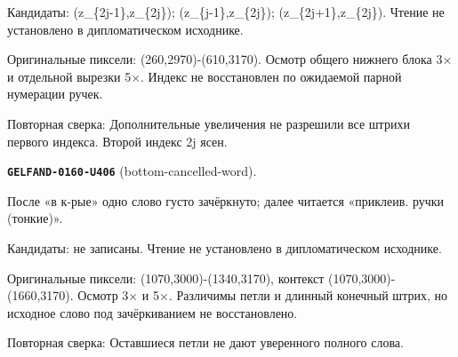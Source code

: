 Кандидаты: (z\_\{2j-1\},z\_\{2j\}); (z\_\{j-1\},z\_\{2j\}); (z\_\{2j+1\},z\_\{2j\}). Чтение не установлено в дипломатическом исходнике.\par
Оригинальные пиксели: (260,2970)-(610,3170). Осмотр общего нижнего блока 3× и отдельной вырезки 5×. Индекс не восстановлен по ожидаемой парной нумерации ручек.\par
Повторная сверка: Дополнительные увеличения не разрешили все штрихи первого индекса. Второй индекс 2j ясен.\par\medskip
\par\noindent\leavevmode{}\label{GELFAND-0160-U406}\label{GELFAND-P001480:bottom-cancelled-word}\textbf{\texttt{GELFAND-0160-U406}} (bottom-cancelled-word).\nopagebreak[4]\par
После «в к-рые» одно слово густо зачёркнуто; далее читается «приклеив. ручки (тонкие)».\par
Кандидаты: не записаны. Чтение не установлено в дипломатическом исходнике.\par
Оригинальные пиксели: (1070,3000)-(1340,3170), контекст (1070,3000)-(1660,3170). Осмотр 3× и 5×. Различимы петли и длинный конечный штрих, но исходное слово под зачёркиванием не восстановлено.\par
Повторная сверка: Оставшиеся петли не дают уверенного полного слова.\par\medskip
